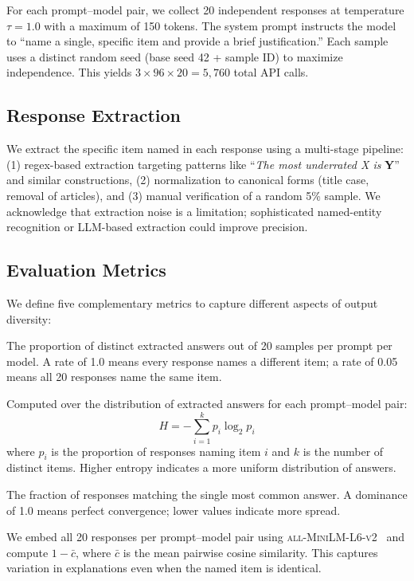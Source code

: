For each prompt--model pair, we collect 20 independent responses at temperature $\tau = 1.0$ with a maximum of 150 tokens. The system prompt instructs the model to ``name a single, specific item and provide a brief justification.'' Each sample uses a distinct random seed (base seed 42 + sample ID) to maximize independence. This yields $3 \times 96 \times 20 = 5{,}760$ total API calls.

\subsection{Response Extraction}

We extract the specific item named in each response using a multi-stage pipeline: (1) regex-based extraction targeting patterns like ``\textit{The most underrated X is} \textbf{Y}'' and similar constructions, (2) normalization to canonical forms (\eg title case, removal of articles), and (3) manual verification of a random 5\% sample. We acknowledge that extraction noise is a limitation; sophisticated named-entity recognition or LLM-based extraction could improve precision.

\subsection{Evaluation Metrics}
\label{sec:metrics}

We define five complementary metrics to capture different aspects of output diversity:

 The proportion of distinct extracted answers out of 20 samples per prompt per model. A rate of 1.0 means every response names a different item; a rate of 0.05 means all 20 responses name the same item.

 Computed over the distribution of extracted answers for each prompt--model pair:
\begin{equation}
    H = -\sum_{i=1}^{k} p_i \log_2 p_i
    \label{eq:entropy}
\end{equation}
where $p_i$ is the proportion of responses naming item $i$ and $k$ is the number of distinct items. Higher entropy indicates a more uniform distribution of answers.

 The fraction of responses matching the single most common answer. A dominance of 1.0 means perfect convergence; lower values indicate more spread.

 We embed all 20 responses per prompt--model pair using \textsc{all-MiniLM-L6-v2}~\cite{reimers2019sentence} and compute $1 - \bar{c}$, where $\bar{c}$ is the mean pairwise cosine similarity. This captures variation in explanations even when the named item is identical.

